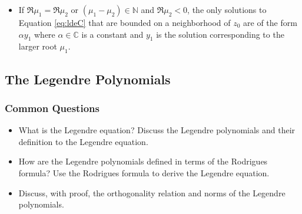 \documentclass[11pt, a4paper]{article}
\newcommand{\C}{\mathbb{C}} %
\begin{document}
\begin{itemize}
	\item If $ \Re \mu_{1} = \Re \mu_{2}$ or $ (\mu_{1} - \mu_{2}) \in \mathbb{N} $ and $ \Re \mu_{2} < 0 $, the only solutions to Equation \ref{eq:ldeC} that are bounded on a neighborhood of $ z_{0} $ are of the form $ \alpha y_{1} $ where $ \alpha \in \C $ is a constant and $ y_{1} $ is the solution corresponding to the larger root $ \mu_{1} $.
	
	
\end{itemize}


\subsection{The Legendre Polynomials}
\subsubsection{Common Questions}
\begin{itemize}
	\item What is the Legendre equation? Discuss the Legendre polynomials and their definition to the Legendre equation.
	
	\item How are the Legendre polynomials defined in terms of the Rodrigues formula? Use the Rodrigues formula to derive the Legendre equation.
	
	\item Discuss, with proof, the orthogonality relation and norms of the Legendre polynomials. 
	
	\iffalse
	\item How are the Laguerre polynomials defined?
	
	\item Derive the second order homogeneous LDE solved by the Laguerre polynomials $ L_{n}(z) = \frac{e^{z}}{n!} \dv[n]{}{z} (z^{n}e^{-z})$.
	
	
	\item What are the Hermite polynomials? What equation to they solve? (Derive the homogeneous 2nd order linear differential equation solved by the Hermite polynomials $ H_{n} $). 
	
	\textit{The equation is} $ y'' - 2xy' + 2 \nu y = 0 $. See page 261 of textbook.
	
	\item How are the Chebyshev polynomials defined? Derive the homogeneous second-order LDE solved by the Chebyshev polynomials $ T_{n}(z) $.
	\fi
\end{itemize}
\end{document}
